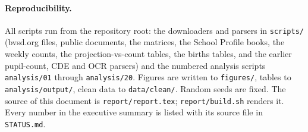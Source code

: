 \documentclass[11pt]{article}
\begin{document}
\paragraph{Reproducibility.}\label{app:repro}
\sloppy All scripts run from the repository root: the downloaders and parsers in \texttt{scripts/} (bvsd.org files, public documents, the matrices, the School Profile books, the weekly counts, the projection-vs-count tables, the births tables, and the earlier pupil-count, CDE and OCR parsers) and the numbered analysis scripts \texttt{analysis/01} through \texttt{analysis/20}. Figures are written to \texttt{figures/}, tables to \texttt{analysis/output/}, clean data to \texttt{data/clean/}. Random seeds are fixed. The source of this document is \texttt{report/report.tex}; \texttt{report/build.sh} renders it. Every number in the executive summary is listed with its source file in \texttt{STATUS.md}.
\end{document}
